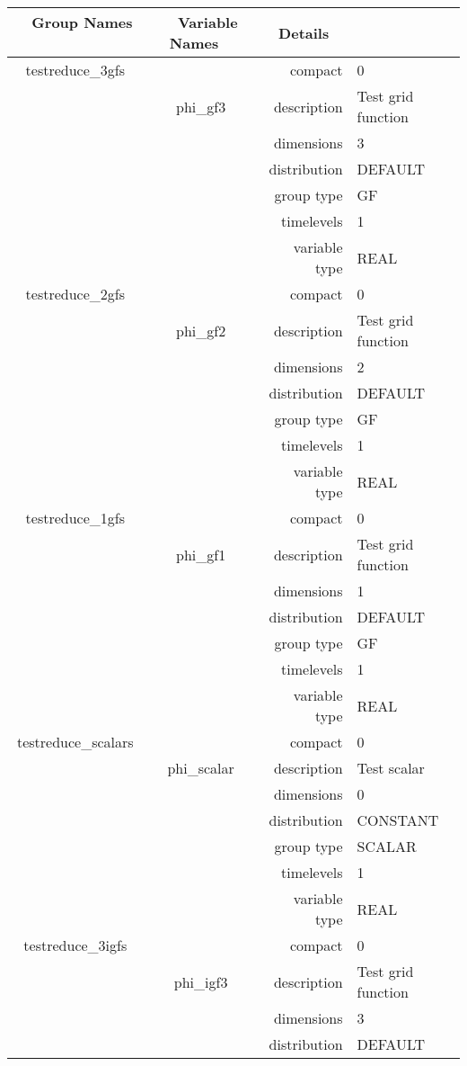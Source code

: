 \begin{tabular*}{150mm}{|c|c@{\extracolsep{\fill}}|rl|} \hline 
~ {\bf Group Names} ~ & ~ {\bf Variable Names} ~  &{\bf Details} ~ & ~\\ 
\hline 
testreduce\_3gfs &  & compact & 0 \\ 
 & phi\_gf3 & description & Test grid function \\ 
 &  & dimensions & 3 \\ 
 &  & distribution & DEFAULT \\ 
 &  & group type & GF \\ 
 &  & timelevels & 1 \\ 
 &  & variable type & REAL \\ 
\hline 
testreduce\_2gfs &  & compact & 0 \\ 
 & phi\_gf2 & description & Test grid function \\ 
 &  & dimensions & 2 \\ 
 &  & distribution & DEFAULT \\ 
 &  & group type & GF \\ 
 &  & timelevels & 1 \\ 
 &  & variable type & REAL \\ 
\hline 
testreduce\_1gfs &  & compact & 0 \\ 
 & phi\_gf1 & description & Test grid function \\ 
 &  & dimensions & 1 \\ 
 &  & distribution & DEFAULT \\ 
 &  & group type & GF \\ 
 &  & timelevels & 1 \\ 
 &  & variable type & REAL \\ 
\hline 
testreduce\_scalars &  & compact & 0 \\ 
 & phi\_scalar & description & Test scalar \\ 
 &  & dimensions & 0 \\ 
 &  & distribution & CONSTANT \\ 
 &  & group type & SCALAR \\ 
 &  & timelevels & 1 \\ 
 &  & variable type & REAL \\ 
\hline 
testreduce\_3igfs &  & compact & 0 \\ 
 & phi\_igf3 & description & Test grid function \\ 
 &  & dimensions & 3 \\ 
 &  & distribution & DEFAULT \\ 

\end{tabular*}
